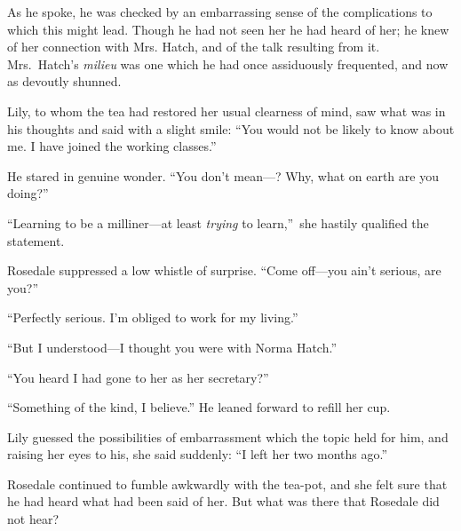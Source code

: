 \documentclass[12pt,a4paper]{book}
\begin{document}
As he spoke, he was checked by an embarrassing sense of the
complications to which this might lead. Though he had not seen
her he had heard of her; he knew of her connection with Mrs.
Hatch, and of the talk resulting from it. Mrs.\ Hatch's \textit{milieu} was
one which he had once assiduously frequented, and now as devoutly
shunned.





Lily, to whom the tea had restored her usual clearness of mind,
saw what was in his thoughts and said with a slight smile: ``You
would not be likely to know about me. I have joined the working
classes.''





He stared in genuine wonder. ``You don't mean---? Why, what on earth
are you doing?''





``Learning to be a milliner---at least \textit{trying} to learn,''\ she
hastily qualified the statement.





Rosedale suppressed a low whistle of surprise. ``Come off---you
ain't serious, are you?''





``Perfectly serious. I'm obliged to work for my living.''





``But I understood---I thought you were with Norma Hatch.''





``You heard I had gone to her as her secretary?''





``Something of the kind, I believe.'' He leaned forward to refill
her cup.





Lily guessed the possibilities of embarrassment which the topic
held for him, and raising her eyes to his, she said suddenly: ``I
left her two months ago.''





Rosedale continued to fumble awkwardly with the tea-pot, and she
felt sure that he had heard what had been said of her. But what
was there that Rosedale did not hear?
\end{document}
